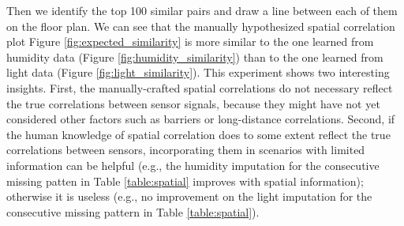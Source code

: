 Then we identify the top 100 similar pairs and draw a line between each of them on the floor plan.
We can see that the manually hypothesized spatial correlation plot Figure \ref{fig:expected_similarity} is more similar to the one learned from humidity data (Figure \ref{fig:humidity_similarity}) than to the one learned from light data (Figure \ref{fig:light_similarity}).
This experiment shows two interesting insights.
First, the manually-crafted spatial correlations do not necessary reflect the true correlations between sensor signals, because they might have not yet considered other factors such as barriers or long-distance correlations. 
Second, if the human knowledge of spatial correlation does to some extent reflect the true correlations between sensors, incorporating them in scenarios with limited information can be helpful (e.g., the humidity imputation for the consecutive missing patten in Table \ref{table:spatial} improves with spatial information); otherwise it is useless (e.g., no improvement on the light imputation for the consecutive missing pattern in Table \ref{table:spatial}).
